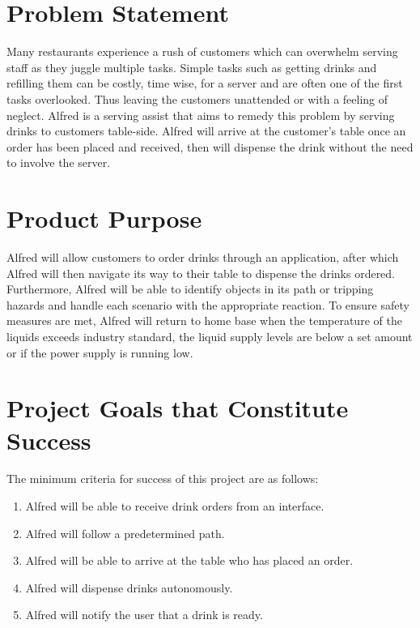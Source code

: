 \documentclass [11pt]{article}
\begin{document}
\pagebreak


\section{Problem Statement}

\indent\indent Many restaurants experience a rush of customers which can overwhelm serving staff as they juggle multiple tasks. Simple tasks such as getting drinks and refilling them can be costly, time wise, for a server and are often one of the first tasks overlooked. Thus leaving the customers unattended or with a feeling of neglect. Alfred is a serving assist that aims to remedy this problem by serving drinks to customers table-side. Alfred will arrive at the customer's table once an order has been placed and received, then will dispense the drink without the need to involve the server. 


\section{Product Purpose}

\indent\indent Alfred will allow customers to order drinks through an application, after which Alfred will then navigate its way to their table to dispense the drinks ordered. Furthermore, Alfred will be able to identify objects in its path or tripping hazards and handle each scenario with the appropriate reaction. To ensure safety measures are met, Alfred will return to home base when the temperature of the liquids exceeds industry standard, the liquid supply levels are below a set amount or if the power supply is running low.


\section{Project Goals that Constitute Success }
The minimum criteria for success of this project are as follows:

\begin{enumerate}[label=M\arabic*:, ref =\arabic*, leftmargin=0.5in]

	\item Alfred will be able to receive drink orders from an interface.
	\item Alfred will follow a predetermined path.
	\item Alfred will be able to arrive at the table who has placed an order.
	\item Alfred will dispense drinks autonomously.
	\item Alfred will notify the user that a drink is ready.
	
\end{enumerate}
\end{document}

